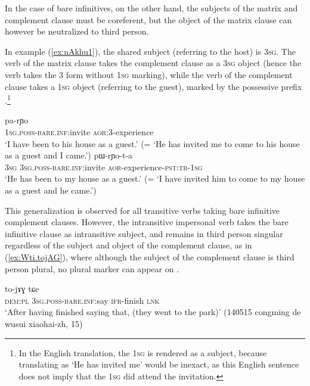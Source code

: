 In the case of bare infinitives, on the other hand, the subjects of the matrix and complement clause must be coreferent, but the object of the matrix clause can however be neutralized to third person.

In example (\ref{ex:nAkhu1}), the shared subject (referring to the host) is \textsc{3sg}. The verb of the matrix clause takes the complement clause as a \textsc{3sg} object (hence the verb takes the 3\flobv{} form without \textsc{1sg} marking), while the verb of the complement clause takes a \textsc{1sg} object (referring to the guest), marked by the possessive prefix .\footnote{In the English translation, the \textsc{1sg} is rendered as a subject, because translating   as `He has invited me' would be inexact, as this English sentence does not imply that the \textsc{1sg} did attend the invitation. }

\begin{exe}
\ex  \label{ex:nAkhu1}
\gll [a-nɤkʰu] pa-rɲo \\
\textsc{1sg}.\textsc{poss}-\textsc{bare}.\textsc{inf:}invite \textsc{aor}:3\flobv{}-experience \\
\glt `I have been to his house as a guest.' (= `He has invited me to come to his house as a guest and I came.')
\ex  \label{ex:nAkhu2}
 pɯ-rɲo-t-a  \\
\textsc{3sg}  \textsc{3sg}.\textsc{poss}-\textsc{bare}.\textsc{inf}:invite \textsc{aor}-experience-\textsc{pst}:\textsc{tr}-\textsc{1sg} \\
\glt `He has been to my house as a guest.' (= `I have invited him to come to my house as a guest and he came.')
\end{exe}

This generalization is observed for all transitive verbs taking bare infinitive complement clauses. However, the intransitive impersonal verb  takes the bare infinitive clause as intransitive subject, and remains in third person singular regardless of the subject and object of the complement clause, as in (\ref{ex:Wti.tojAG}), where although the subject of the complement clause is third person plural, no plural marker can appear on .

\begin{exe}
\ex \label{ex:Wti.tojAG}
\gll [nɯra ɯ-ti] to-jɤɣ tɕe \\
\textsc{dem}:\textsc{pl} \textsc{3sg}.\textsc{poss}-\textsc{bare}.\textsc{inf}:say \textsc{ifr}-finish \textsc{lnk}\\
\glt `After having finished saying that, (they went to the park)' (140515 congming de wusui xiaohai-zh, 15)
\end{exe}

